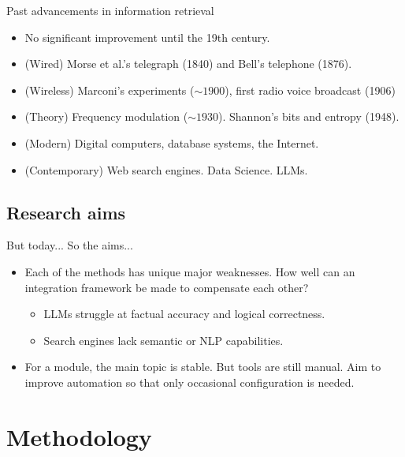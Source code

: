 \documentclass{beamer}
\begin{document}
\begin{frame}{Past advancements in information retrieval}
  \begin{itemize}
	\item No significant improvement until the 19th century.
	\item (Wired) Morse et al.'s telegraph (1840) and Bell's telephone (1876).
	\item (Wireless) Marconi's experiments ($\sim 1900$), first radio voice
		broadcast (1906) 
	\item (Theory) Frequency modulation ($\sim 1930$).  Shannon's bits and
		entropy (1948).   
	\item (Modern) Digital computers, database systems, the Internet.
	\item (Contemporary) Web search engines. Data Science. LLMs.
\end{itemize}
\end{frame}

\subsection{Research aims}
\begin{frame}{But today... So the aims...}
\begin{itemize}
	\item Each of the methods has unique major weaknesses. How well can an
		integration framework be made to compensate each other?
	\begin{itemize}
		\item LLMs struggle at factual accuracy and logical correctness.
		\item Search engines lack semantic or NLP capabilities.
	\end{itemize}
	\item For a module, the main topic is stable. But tools are still manual.
		Aim to improve automation so that only occasional configuration is
		needed.
\end{itemize}
\end{frame}

\section{Methodology}
\end{document}
